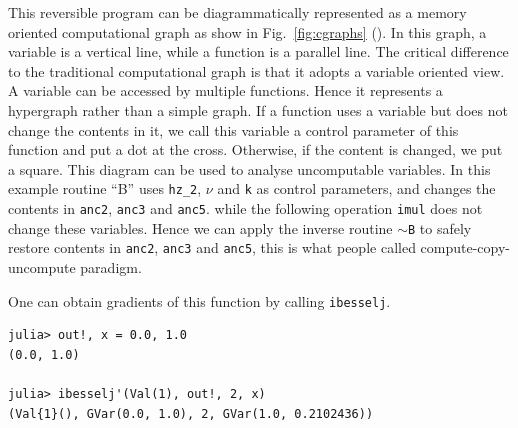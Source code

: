 \documentclass[aps,twocolumn,longbibliography,english,superscriptaddress]{revtex4-1}
\newcommand{\<}{\langle}
\renewcommand{\>}{\rangle}
\newcommand{\Fig}[1]{Fig.~\ref{#1}}
\theoremstyle{definition}\newtheorem{definition}{\textit{Definition}}
\begin{document}
This reversible program can be diagrammatically represented as a memory oriented computational graph as show in \Fig{fig:cgraphs} ().
In this graph, a variable is a vertical line, while a function is a parallel line.
The critical difference to the traditional computational graph is that it adopts a variable oriented view.
A variable can be accessed by multiple functions. Hence it represents a hypergraph rather than a simple graph.
If a function uses a variable but does not change the contents in it, we call this variable a control parameter of this function and put a dot at the cross. Otherwise, if the content is changed, we put a square.
This diagram can be used to analyse uncomputable variables. In this example routine ``B'' uses \texttt{hz\_2}, \texttt{$\nu$} and \texttt{k} as control parameters, and changes the contents in \texttt{anc2}, \texttt{anc3} and \texttt{anc5}.
while the following operation \texttt{imul} does not change these variables.
Hence we can apply the inverse routine \texttt{$\sim$B} to safely restore contents in \texttt{anc2}, \texttt{anc3} and \texttt{anc5}, this is what people called compute-copy-uncompute paradigm.


One can obtain gradients of this function by calling \texttt{ibesselj\textquotesingle}.

\begin{minipage}{.44\textwidth}
\begin{lstlisting}
julia> out!, x = 0.0, 1.0
(0.0, 1.0)

julia> ibesselj'(Val(1), out!, 2, x)
(Val{1}(), GVar(0.0, 1.0), 2, GVar(1.0, 0.2102436))
\end{lstlisting}
\end{minipage}
\end{document}
